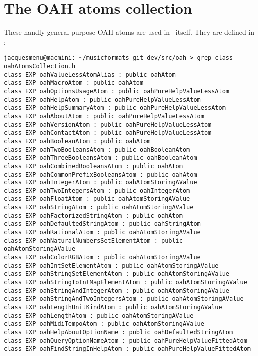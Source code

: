 



\chapter{The OAH atoms collection}\label{The OAH atoms collection}

These handly general-purpose OAH atoms are used in \mf\ itself. They are defined in :
\begin{lstlisting}[language=Terminal]
jacquesmenu@macmini: ~/musicformats-git-dev/src/oah > grep class   oahAtomsCollection.h
class EXP oahValueLessAtomAlias : public oahAtom
class EXP oahMacroAtom : public oahAtom
class EXP oahOptionsUsageAtom : public oahPureHelpValueLessAtom
class EXP oahHelpAtom : public oahPureHelpValueLessAtom
class EXP oahHelpSummaryAtom : public oahPureHelpValueLessAtom
class EXP oahAboutAtom : public oahPureHelpValueLessAtom
class EXP oahVersionAtom : public oahPureHelpValueLessAtom
class EXP oahContactAtom : public oahPureHelpValueLessAtom
class EXP oahBooleanAtom : public oahAtom
class EXP oahTwoBooleansAtom : public oahBooleanAtom
class EXP oahThreeBooleansAtom : public oahBooleanAtom
class EXP oahCombinedBooleansAtom : public oahAtom
class EXP oahCommonPrefixBooleansAtom : public oahAtom
class EXP oahIntegerAtom : public oahAtomStoringAValue
class EXP oahTwoIntegersAtom : public oahIntegerAtom
class EXP oahFloatAtom : public oahAtomStoringAValue
class EXP oahStringAtom : public oahAtomStoringAValue
class EXP oahFactorizedStringAtom : public oahAtom
class EXP oahDefaultedStringAtom : public oahStringAtom
class EXP oahRationalAtom : public oahAtomStoringAValue
class EXP oahNaturalNumbersSetElementAtom : public oahAtomStoringAValue
class EXP oahColorRGBAtom : public oahAtomStoringAValue
class EXP oahIntSetElementAtom : public oahAtomStoringAValue
class EXP oahStringSetElementAtom : public oahAtomStoringAValue
class EXP oahStringToIntMapElementAtom : public oahAtomStoringAValue
class EXP oahStringAndIntegerAtom : public oahAtomStoringAValue
class EXP oahStringAndTwoIntegersAtom : public oahAtomStoringAValue
class EXP oahLengthUnitKindAtom : public oahAtomStoringAValue
class EXP oahLengthAtom : public oahAtomStoringAValue
class EXP oahMidiTempoAtom : public oahAtomStoringAValue
class EXP oahHelpAboutOptionName : public oahDefaultedStringAtom
class EXP oahQueryOptionNameAtom : public oahPureHelpValueFittedAtom
class EXP oahFindStringInHelpAtom : public oahPureHelpValueFittedAtom
\end{lstlisting}


